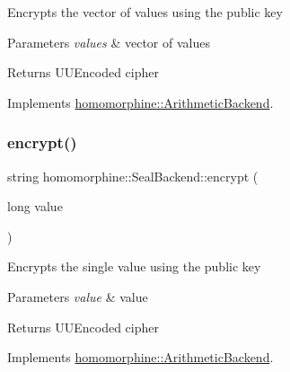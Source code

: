 Encrypts the vector of values using the public key


\begin{DoxyParams}{Parameters}
{\em values} & vector of values \\
\hline
\end{DoxyParams}
\begin{DoxyReturn}{Returns}
U\+U\+Encoded cipher 
\end{DoxyReturn}


Implements \mbox{\hyperlink{classhomomorphine_1_1_arithmetic_backend_ae97a4987b6024961d8b70a4a0ad2d653}{homomorphine\+::\+Arithmetic\+Backend}}.

\mbox{\label{classhomomorphine_1_1_seal_backend_af64a70096e488a75aadbd934cf73d482}} 
\subsubsection{\texorpdfstring{encrypt()}{encrypt()}\hspace{0.1cm}{\footnotesize\ttfamily [2/2]}}
{\footnotesize\ttfamily string homomorphine\+::\+Seal\+Backend\+::encrypt (\begin{DoxyParamCaption}\item[{long}]{value }\end{DoxyParamCaption})\hspace{0.3cm}{\ttfamily [virtual]}}

Encrypts the single value using the public key


\begin{DoxyParams}{Parameters}
{\em value} & value \\
\hline
\end{DoxyParams}
\begin{DoxyReturn}{Returns}
U\+U\+Encoded cipher 
\end{DoxyReturn}


Implements \mbox{\hyperlink{classhomomorphine_1_1_arithmetic_backend_ad6aedf61ae1a6257e81bd415ec08ac17}{homomorphine\+::\+Arithmetic\+Backend}}.

\mbox{\label{classhomomorphine_1_1_seal_backend_a1e2ed46b896d4a5b5d930ec7bcd3207b}} 
